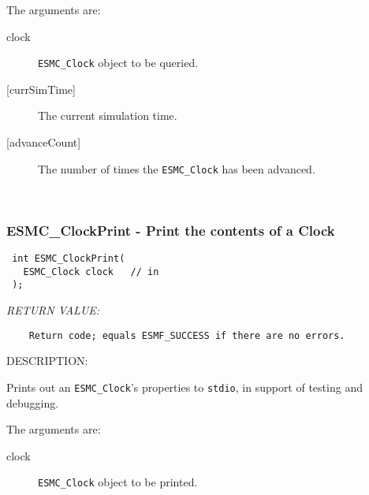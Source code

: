     The arguments are:
    \begin{description}
    \item[clock]
      {\tt ESMC\_Clock} object to be queried.
    \item[{[currSimTime]}]
      The current simulation time.
    \item[{[advanceCount]}]
      The number of times the {\tt ESMC\_Clock} has been advanced.
    \end{description}
   
 
\mbox{}\hrulefill\ 
 
\subsubsection [ESMC\_ClockPrint] {ESMC\_ClockPrint - Print the contents of a Clock}


  
\begin{verbatim} int ESMC_ClockPrint(
   ESMC_Clock clock   // in
 );
 \end{verbatim}{\em RETURN VALUE:}
\begin{verbatim}    Return code; equals ESMF_SUCCESS if there are no errors.\end{verbatim}
{\sf DESCRIPTION:\\ }


  
    Prints out an {\tt ESMC\_Clock}'s properties to {\tt stdio}, 
    in support of testing and debugging.
  
    The arguments are:
    \begin{description}
    \item[clock]
      {\tt ESMC\_Clock} object to be printed.
    \end{description}
  
\setlength{\parskip}{\oldparskip}
\setlength{\parindent}{\oldparindent}
\setlength{\baselineskip}{\oldbaselineskip}
